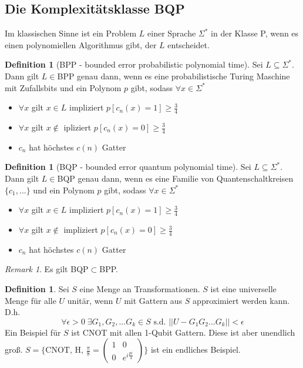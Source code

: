 \documentclass[a4paper, 12pt]{article}
\theoremstyle{plain}
\theoremstyle{definition}
\newtheorem{definition}[theorem]{Definition} %
\theoremstyle{lemma}
\theoremstyle{remark}
\newtheorem{remark}[theorem]{Remark}
\theoremstyle{example}
\begin{document}
	\subsection{Die Komplexitätsklasse BQP}
	Im klassischen Sinne ist ein Problem $L$ einer Sprache $\Sigma^*$ in der Klasse P, wenn es einen polynomiellen Algorithmus gibt, der $L$ entscheidet.
	\begin{definition}[BPP - bounded error probabilistic polynomial time]
		Sei $L\subseteq \Sigma^*$. Dann gilt $L\in$BPP genau dann, wenn es eine probabilistische Turing Maschine mit Zufallsbits und ein Polynom $p$ gibt, sodass $\forall x \in \Sigma^*$
		\begin{itemize}
			\item $\forall x$ gilt $x \in L$ impliziert $p[c_n(x) = 1] \geq \frac{3}{4}$
			\item $\forall x$ gilt $x \notin $ ipliziert $p[c_n(x) = 0] \geq \frac{3}{4}$
			\item $c_n$ hat höchstes $c(n)$ Gatter
		\end{itemize}
	\end{definition}
	\begin{definition}[BQP - bounded error quantum polynomial time]
		Sei $L\subseteq \Sigma^*$. Dann gilt $L\in$BQP genau dann, wenn es eine Familie von Quantenschaltkreisen $\{c_1,...\}$ und ein Polynom $p$ gibt, sodass $\forall x \in \Sigma^*$ \begin{itemize}
			\item $\forall x$ gilt $x \in L$ impliziert $p[c_n(x) = 1] \geq \frac{3}{4}$
			\item $\forall x$ gilt $x \notin $ impliziert $p[c_n(x) = 0] \geq \frac{3}{4}$
			\item $c_n$ hat höchstes $c(n)$ Gatter
		\end{itemize}
	\end{definition} 
	\begin{remark}
		Es gilt BQP$\subset$BPP.
	\end{remark}
	\begin{definition}
		Sei $S$ eine Menge an Transformationen. $S$ ist eine universelle Menge für alle $U$ unitär, wenn $U$ mit Gattern aus $S$ approximiert werden kann. D.h. \[\forall \epsilon > 0 \; \exists G_1,G_2,...G_k \in S \text{ s.d. } ||U-G_1G_2...G_k|| < \epsilon\]
		Ein Beispiel für $S$ ist CNOT mit allen 1-Qubit Gattern. Diese ist aber unendlich groß. $S = \{\text{CNOT, H, } \frac{\pi}{8} = \begin{pmatrix}
			1&0\\0&e^{i\frac{pi}{4}}
		\end{pmatrix}\}$ ist ein endliches Beispiel.
	\end{definition}
\end{document}
